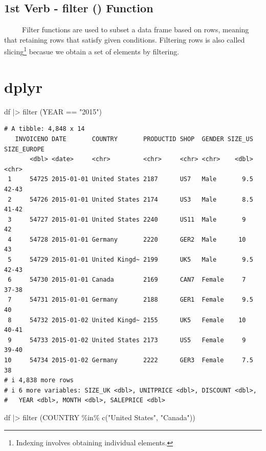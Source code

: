 \documentclass[
  letterpaper,
  DIV=11,
  numbers=noendperiod]{scrreprt}
\newenvironment{Shaded}{\begin{snugshade}}{\end{snugshade}}
\newcommand{\FunctionTok}[1]{\textcolor[rgb]{0.28,0.35,0.67}{#1}}
\newcommand{\NormalTok}[1]{\textcolor[rgb]{0.00,0.23,0.31}{#1}}
\newcommand{\SpecialCharTok}[1]{\textcolor[rgb]{0.37,0.37,0.37}{#1}}
\newcommand{\StringTok}[1]{\textcolor[rgb]{0.13,0.47,0.30}{#1}}
\begin{document}
\subsection{1st Verb - filter ()
Function}\label{st-verb---filter-function}

~~~~~Filter functions are used to subset a data frame based on rows,
meaning that retaining rows that satisfy given conditions. Filtering
rows is also called slicing\footnote{Indexing involves obtaining
  individual elements.} becasue we obtain a set of elements by
filtering.

\section{dplyr}

\begin{Shaded}
\begin{Highlighting}[]
\NormalTok{df }\SpecialCharTok{|\textgreater{}} \FunctionTok{filter}\NormalTok{ (YEAR }\SpecialCharTok{==} \StringTok{"2015"}\NormalTok{)}
\end{Highlighting}
\end{Shaded}

\begin{verbatim}
# A tibble: 4,848 x 14
   INVOICENO DATE       COUNTRY       PRODUCTID SHOP  GENDER SIZE_US SIZE_EUROPE
       <dbl> <date>     <chr>         <chr>     <chr> <chr>    <dbl> <chr>      
 1     54725 2015-01-01 United States 2187      US7   Male       9.5 42-43      
 2     54726 2015-01-01 United States 2174      US3   Male       8.5 41-42      
 3     54727 2015-01-01 United States 2240      US11  Male       9   42         
 4     54728 2015-01-01 Germany       2220      GER2  Male      10   43         
 5     54729 2015-01-01 United Kingd~ 2199      UK5   Male       9.5 42-43      
 6     54730 2015-01-01 Canada        2169      CAN7  Female     7   37-38      
 7     54731 2015-01-01 Germany       2188      GER1  Female     9.5 40         
 8     54732 2015-01-02 United Kingd~ 2155      UK5   Female    10   40-41      
 9     54733 2015-01-02 United States 2173      US5   Female     9   39-40      
10     54734 2015-01-02 Germany       2222      GER3  Female     7.5 38         
# i 4,838 more rows
# i 6 more variables: SIZE_UK <dbl>, UNITPRICE <dbl>, DISCOUNT <dbl>,
#   YEAR <dbl>, MONTH <dbl>, SALEPRICE <dbl>
\end{verbatim}

\begin{Shaded}
\begin{Highlighting}[]
\NormalTok{df }\SpecialCharTok{|\textgreater{}} \FunctionTok{filter}\NormalTok{ (COUNTRY }\SpecialCharTok{\%in\%} \FunctionTok{c}\NormalTok{(}\StringTok{"United States"}\NormalTok{, }\StringTok{"Canada"}\NormalTok{))}
\end{Highlighting}
\end{Shaded}
\end{document}
